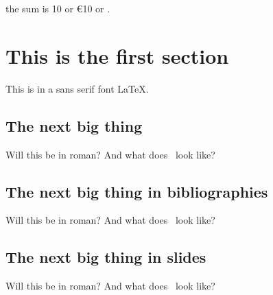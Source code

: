 ﻿\documentclass{article}
\begin{document}
the sum is \texteuro{}10 or \euro{10} or .
\rm

\section{This is the first section}

\sf This is in a sans serif font \LaTeX.

\subsection{The next big thing}

Will this be in roman?  And what does \LaTeXe\ look like?

\subsection{The next big thing in bibliographies}

Will this be in roman?  And what does \BibTeX\ look like?

\subsection{The next big thing in slides}

Will this be in roman?  And what does \SLiTeX\ look like?
\end{document}
